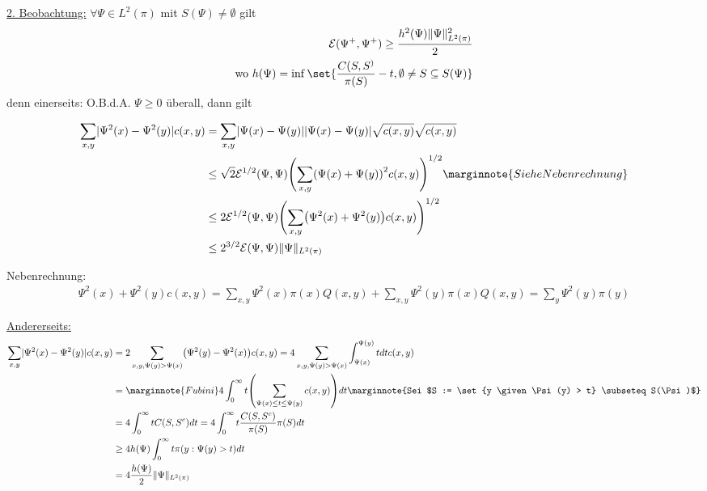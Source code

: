 \begin{beweis}
	\underline{2. Beobachtung:} $\forall \Psi \in L^2(\pi)$ mit $S(\Psi) \neq \emptyset$ gilt
	\begin{align}
		\mathcal{E} (\Psi^+,\Psi^+) \geq \frac{h^2(\Psi) \Norm{\Psi}^2_{L^2(\pi)}}{2} \\
		\text{wo } h(\Psi) = \inf \set{ \frac{C(S,S^)}{\pi(S)} - t, \emptyset \neq S \subseteq S(\Psi)  }
	\end{align}
	denn einerseits: O.B.d.A. $\Psi \geq 0$ überall, dann gilt
	
	\begin{align}
		\sum\limits_{x,y} \abs{\Psi^2(x) - \Psi^2(y)} c(x,y) &= \sum\limits_{x,y} \abs{\Psi(x) - \Psi(y)} \abs{\Psi(x) - \Psi(y)} \sqrt{c(x,y)} \sqrt{c(x,y)} \\
		&\leq \sqrt{2} \mathcal{E}^{1/2} (\Psi,\Psi) \enb{\sum\limits_{x,y}\enb{\Psi(x) + \Psi(y)}^2 c(x,y) }^{1/2} \marginnote{Siehe Nebenrechnung}\\
		&\leq 2 \mathcal{E}^{1/2}(\Psi,\Psi) \enb{\sum\limits_{x,y} \enb{\Psi^2(x) + \Psi^2(y) } c(x,y) }^{1/2} \\
		&\leq 2^{3/2} \mathcal{E} (\Psi,\Psi) \Norm{ \Psi }_{L^2(\pi)}
	\end{align}
	
	Nebenrechnung: 
	\begin{align}
		\Psi^2(x) + \Psi^2(y) c(x,y) = \sum\limits_{x,y} \Psi^2(x) \pi(x) Q(x,y) + \sum\limits_{x,y} \Psi^2(y) \pi(x) Q(x,y) = \sum\limits_{y}\Psi^2(y)\pi(y)
	\end{align}
	
	\underline{Andererseits:} 
	\begin{align}
		\sum\limits_{x,y} \abs{\Psi^2(x) - \Psi^2(y)}c(x,y) &= 2 \sum\limits_{x,y, \Psi(y) > \Psi(x)} \enb{\Psi^2(y) - \Psi^2(x)} c(x,y) = 4 \sum\limits_{x,y, \Psi(y) > \Psi(x)} \int_{\Psi(x)}^{\Psi(y)} t dt c(x,y) \\
		&= \marginnote{Fubini} 4 \int_{0}^{\infty} t\enb{\sum\limits_{\Psi(x) \leq t \leq \Psi(y)} c(x,y) } dt \marginnote{Sei $S := \set{y \given \Psi(y) > t} \subseteq S(\Psi)$} \\
		&= 4 \int_{0}^{\infty} t C(S,S^c) dt = 4 \int_{0}^{\infty} t \frac{C(S,S^c)}{\pi(S)} \pi(S) dt \\
		&\geq 4h(\Psi) \int_{0}^{\infty} t \pi(y : \Psi(y) > t) dt \\
		&= 4 \frac{h(\Psi)}{2} \Norm{ \Psi }_{L^2(\pi)}
	\end{align}		
	

\end{beweis}
